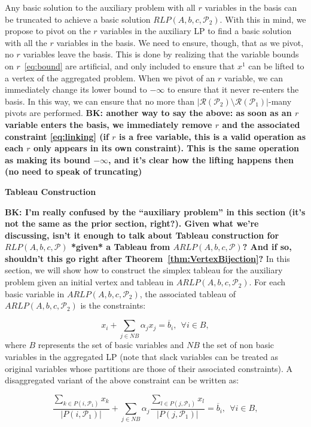 \documentclass[runningheads]{llncs}
\newcommand{\cP}{{\mathcal P}}
\newcommand{\cR}{{\mathcal R}}
\begin{document}
Any basic solution to the auxiliary problem with all $r$ variables in the basis can be truncated to achieve a basic solution $RLP(A,b,c,\cP_2)$. With this in mind, we propose to pivot on the $r$ variables in the auxiliary LP to find a basic solution with all the $r$ variables in the basis. We need to ensure, though, that as we pivot, no $r$ variables leave the basis. This is done by realizing that the variable bounds on $r$~\eqref{eq:bound} are artificial, and only included to ensure that $x^1$ can be lifted to a vertex of the aggregated problem. When we pivot of an $r$ variable, we can immediately change its lower bound to $-\infty$ to ensure that it never re-enters the basis. In this way, we can ensure that no more than $|\cR(\cP_2) \setminus \cR(\cP_1)|$-many pivots are performed. {\bf BK: another way to say the above: as soon as an $r$ variable enters the basis, we immediately remove $r$ and the associated constraint \eqref{eq:linking} (if $r$ is a free variable, this is a valid  operation as each $r$ only appears in its own constraint). This is the same operation as making its bound $-\infty$, and it's clear how the lifting happens then (no need to speak of truncating)}

 {\bf Tableau Construction}
 
 {\bf BK: I'm really confused by the ``auxiliary problem'' in this section (it's not the same as the prior section, right?). Given what we're discussing, isn't it enough to talk about Tableau construction for $RLP(A,b,c,\cP)$ *given* a Tableau from $ARLP(A,b,c,\cP)$? And if so, shouldn't this go right after Theorem~\ref{thm:VertexBijection}?}
 In this section, we will show how to construct the simplex tableau for the auxiliary problem given an initial vertex and tableau in $ARLP(A,b,c,\cP_2)$. For each basic variable in $ARLP(A,b,c,\cP_2)$, the associated tableau of $ARLP(A,b,c,\cP_2)$ is the constraints:
 
 $$x_i + \sum_{j \in NB} \alpha_j x_j  = \overline{b}_i, \ \ \forall i \in B,$$
 \noindent where $B$ represents the set of basic variables and $NB$ the set of non basic variables in the aggregated LP (note that slack variables can be treated as original variables whose partitions are those of their associated constraints). A disaggregated variant of the above constraint can be written as:
 
 $$\frac{\sum_{k \in P(i,\cP_1) }x_k}{|P(i,\cP_1)|}
 	 + \sum_{j \in NB} \alpha_j \frac{\sum_{l \in P(j,\cP_1) }x_l }{|P(j,\cP_1)|}  = \overline{b}_i, \ \ \forall i \in B,$$
 
\end{document}
